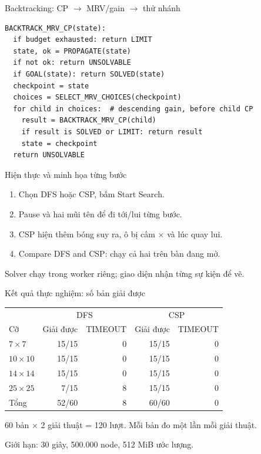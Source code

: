 \begin{frame}[fragile]{Backtracking: CP $\rightarrow$ MRV/gain $\rightarrow$ thử nhánh}
\begin{lstlisting}[breaklines=true]
BACKTRACK_MRV_CP(state):
  if budget exhausted: return LIMIT
  state, ok = PROPAGATE(state)
  if not ok: return UNSOLVABLE
  if GOAL(state): return SOLVED(state)
  checkpoint = state
  choices = SELECT_MRV_CHOICES(checkpoint)
  for child in choices:  # descending gain, before child CP
    result = BACKTRACK_MRV_CP(child)
    if result is SOLVED or LIMIT: return result
    state = checkpoint
  return UNSOLVABLE
\end{lstlisting}
\end{frame}

\begin{frame}{Hiện thực và minh họa từng bước}
\begin{enumerate}
\item Chọn DFS hoặc CSP, bấm Start Search.
\item Pause và hai mũi tên để đi tới/lui từng bước.
\item CSP hiện thêm bóng suy ra, ô bị cấm $\times$ và lúc quay lui.
\item Compare DFS and CSP: chạy cả hai trên bàn đang mở.
\end{enumerate}
\vspace{3mm}\small
Solver chạy trong worker riêng; giao diện nhận từng sự kiện để vẽ.
\end{frame}

\begin{frame}{Kết quả thực nghiệm: số bản giải được}
\centering\small\begin{tabular}{@{}lrrrr@{}}\toprule
 & \multicolumn{2}{c}{DFS} & \multicolumn{2}{c}{CSP}\\
Cỡ & Giải được & TIMEOUT & Giải được & TIMEOUT\\\midrule
$7\times7$ & 15/15 & 0 & 15/15 & 0\\
$10\times10$ & 15/15 & 0 & 15/15 & 0\\
$14\times14$ & 15/15 & 0 & 15/15 & 0\\
$25\times25$ & 7/15 & 8 & 15/15 & 0\\\midrule
Tổng & 52/60 & 8 & 60/60 & 0\\\bottomrule
\end{tabular}\par\vspace{3mm}
\raggedright 60 bản $\times$ 2 giải thuật = 120 lượt. Mỗi bản đo một lần mỗi giải thuật.\par
Giới hạn: 30 giây, 500.000 node, 512 MiB ước lượng.
\end{frame}

